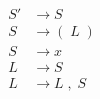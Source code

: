 
\setcounter{equation}{-1}
\begin{align}
	S' &\to S  \\
	S &\to (\;L\;) \\
	S &\to x \\
	L &\to S \\
	L &\to L \;,\; S
\end{align}